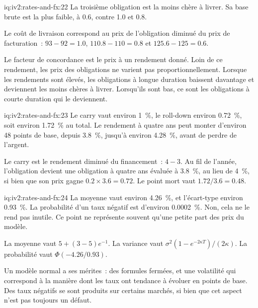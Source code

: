 \begin{solution}{iq:iv2:rates-and-fx:22}
La troisième obligation est la moins chère à livrer. Sa base brute est la plus faible, à 0.6, contre 1.0 et 0.8.

Le coût de livraison correspond au prix de l'obligation diminué du prix de facturation~: $93 - 92 = 1.0$, $110.8 - 110 = 0.8$ et $125.6 - 125 = 0.6$.

Le facteur de concordance est le prix à un rendement donné. Loin de ce rendement, les prix des obligations ne varient pas proportionnellement. Lorsque les rendements sont élevés, les obligations à longue duration baissent davantage et deviennent les moins chères à livrer. Lorsqu'ils sont bas, ce sont les obligations à courte duration qui le deviennent.

\end{solution}

\begin{solution}{iq:iv2:rates-and-fx:23}
Le carry vaut environ 1~\%, le roll-down environ 0.72~\%, soit environ 1.72~\% au total. Le rendement à quatre ans peut monter d'environ 48 points de base, depuis 3.8~\%, jusqu'à environ 4.28~\%, avant de perdre de l'argent.

Le carry est le rendement diminué du financement~: $4 - 3$. Au fil de l'année, l'obligation devient une obligation à quatre ans évaluée à 3.8~\%, au lieu de 4~\%, si bien que son prix gagne $0.2 \times 3.6 = 0.72$. Le point mort vaut $1.72/3.6 = 0.48$.

\end{solution}

\begin{solution}{iq:iv2:rates-and-fx:24}
La moyenne vaut environ 4.26~\%, et l'écart-type environ 0.93~\%. La probabilité d'un taux négatif est d'environ 0.0002~\%. Non, cela ne le rend pas inutile. Ce point ne représente souvent qu'une petite part des prix du modèle.

La moyenne vaut $5 + (3 - 5)e^{-1}$. La variance vaut $\sigma^2(1 - e^{-2\kappa T})/(2\kappa)$. La probabilité vaut $\Phi(-4.26/0.93)$.

Un modèle normal a ses mérites~: des formules fermées, et une volatilité qui correspond à la manière dont les taux ont tendance à évoluer en points de base. Des taux négatifs se sont produits sur certains marchés, si bien que cet aspect n'est pas toujours un défaut.

\end{solution}

